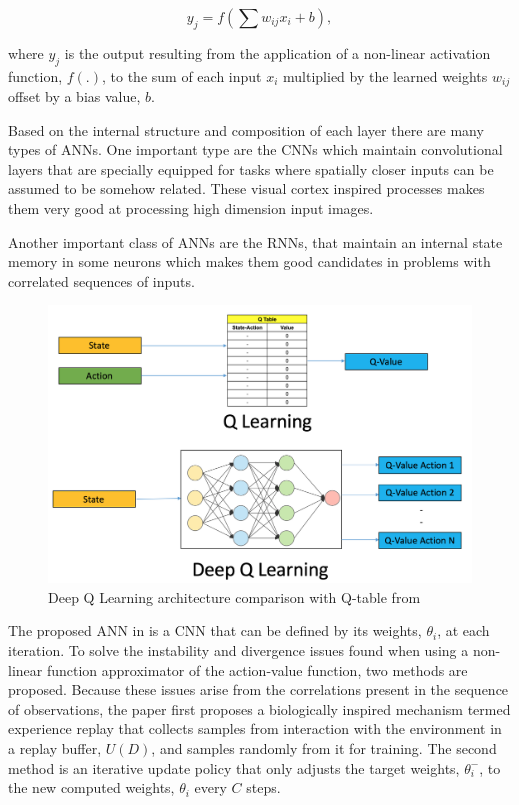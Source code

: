 \begin{equation}
    y_j = f(\sum w_{ij}x_i + b) ,
\end{equation}

where $y_j$ is the output resulting from the application of a non-linear activation function, $f(.)$, to the sum of each input $x_i$ multiplied by the learned weights $w_{ij}$ offset by a bias value, $b$.

Based on the internal structure and composition of each layer there are many types of \acrshort{ANNs}. One important type are the \acrfull{CNNs} which maintain convolutional layers that are specially equipped for tasks where spatially closer inputs can be assumed to be somehow related. These visual cortex inspired processes makes them very good at processing high dimension input images. 

Another important class of \acrshort{ANNs} are the \acrfull{RNNs}, that maintain an internal state memory in some neurons which makes them good candidates in problems with correlated sequences of inputs.

\begin{figure}[h]
  \centering
  \includegraphics[width=\textwidth]{images/DQN.png}
  \caption{Deep Q Learning architecture comparison with Q-table from \cite{dqnimage}} \label{dqnvsqtable}
\end{figure}

The proposed ANN in \cite{DQN} is a CNN that can be defined by its weights, $\theta_i$, at each iteration. To solve the instability and divergence issues found when using a non-linear function approximator of the action-value function, two methods are proposed. Because these issues arise from the correlations present in the sequence of observations, the paper first proposes a biologically inspired mechanism termed experience replay that collects samples from interaction with the environment in a replay buffer, $U(D)$, and samples randomly from it for training. The second method is an iterative update policy that only adjusts the target weights, $\theta_i^-$, to the new computed weights, $\theta_i$ every $C$ steps.

